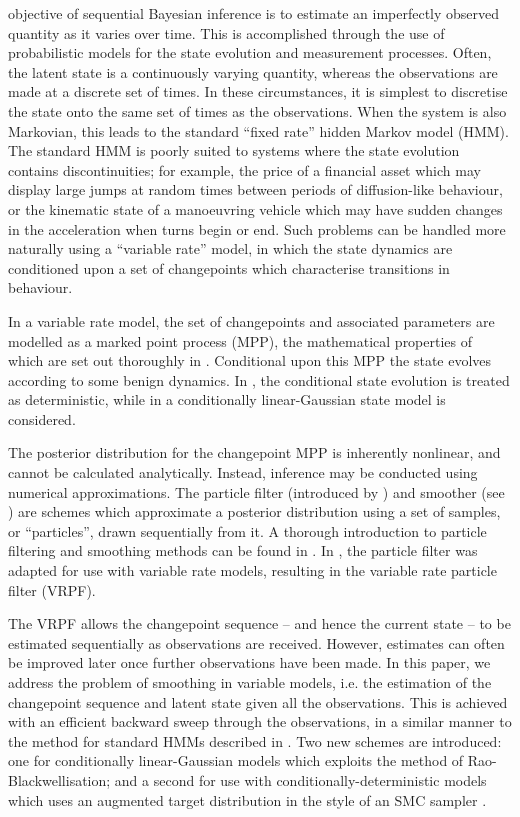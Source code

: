 \documentclass[journal]{IEEEtran}
\begin{document}
 objective of sequential Bayesian inference is to estimate an imperfectly observed quantity as it varies over time. This is accomplished through the use of probabilistic models for the state evolution and measurement processes. Often, the latent state is a continuously varying quantity, whereas the observations are made at a discrete set of times. In these circumstances, it is simplest to discretise the state onto the same set of times as the observations. When the system is also Markovian, this leads to the standard ``fixed rate'' hidden Markov model (HMM). The standard HMM is poorly suited to systems where the state evolution contains discontinuities; for example, the price of a financial asset which may display large jumps at random times between periods of diffusion-like behaviour, or the kinematic state of a manoeuvring vehicle which may have sudden changes in the acceleration when turns begin or end. Such problems can be handled more naturally using a ``variable rate'' model, in which the state dynamics are conditioned upon a set of changepoints which characterise transitions in behaviour.

In a variable rate model, the set of changepoints and associated parameters are modelled as a marked point process (MPP), the mathematical properties of which are set out thoroughly in \cite{Jacobsen2006}. Conditional upon this MPP the state evolves according to some benign dynamics. In \cite{Godsill2007,Whiteley2011}, the conditional state evolution is treated as deterministic, while in \cite{Godsill2007a,Christensen2012} a conditionally linear-Gaussian state model is considered.

The posterior distribution for the changepoint MPP is inherently nonlinear, and cannot be calculated analytically. Instead, inference may be conducted using numerical approximations. The particle filter (introduced by \cite{Gordon1993}) and smoother (see \cite{Doucet2000a,Godsill2004}) are schemes which approximate a posterior distribution using a set of samples, or ``particles'', drawn sequentially from it.  A thorough introduction to particle filtering and smoothing methods can be found in \cite{Cappe2007,Doucet2009}. In \cite{Godsill2007a,Godsill2007,Whiteley2011}, the particle filter was adapted for use with variable rate models, resulting in the variable rate particle filter (VRPF).

The VRPF allows the changepoint sequence -- and hence the current state -- to be estimated sequentially as observations are received. However, estimates can often be improved later once further observations have been made. In this paper, we address the problem of smoothing in variable models, i.e. the estimation of the changepoint sequence and latent state given all the observations. This is achieved with an efficient backward sweep through the observations, in a similar manner to the method for standard HMMs described in \cite{Godsill2004}. Two new schemes are introduced: one for conditionally linear-Gaussian models which exploits the method of Rao-Blackwellisation; and a second for use with conditionally-deterministic models which uses an augmented target distribution in the style of an SMC sampler \cite{DelMoral2006}.
\end{document}
